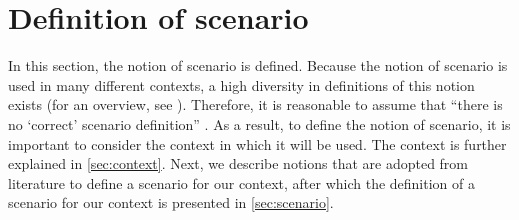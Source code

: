 \section{Definition of scenario}
\label{sec:definition scenario}

In this section, the notion of scenario is defined. Because the notion of scenario is used in many different contexts, a high diversity in definitions of this notion exists (for an overview, see \cite{vannotten2003updated, bishop2007scentechniques}). Therefore, it is reasonable to assume that ``there is no `correct' scenario definition'' \cite{vannotten2003updated}. As a result, to define the notion of scenario, it is important to consider the context in which it will be used. The context is further explained in \cref{sec:context}. Next, we describe notions that are adopted from literature to define a scenario for our context, after which the definition of a scenario for our context is presented in \cref{sec:scenario}.


